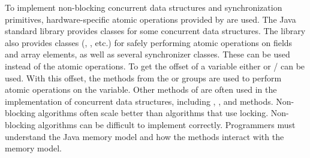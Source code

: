 %
{
  To implement
  non-blocking concurrent data structures and synchronization primitives, hardware-specific atomic operations
  provided by \smu{} are used.
}
{The Java standard library provides classes for some concurrent data structures.
The library also provides classes
(, , etc.)
for safely performing atomic operations on fields and array elements, as well
as several synchronizer classes. These
can be used instead of the \unsafe{} atomic operations.}
{To get the offset of a \java{} variable either  or
  / can be used.
With this offset, the methods from the  or  groups are used to perform atomic operations on the variable.
Other methods of \unsafe{} are often used in the implementation of concurrent
data structures, including , , and  methods.
}
{Non-blocking algorithms often scale better than algorithms that use locking.}
{Non-blocking algorithms can be difficult to implement correctly. Programmers
must understand the Java memory model and how the \unsafe{} methods interact
with the memory model.}

\newcommand\foundinfence{198}
\newcommand\usedbyfence{9795}
\newcommand\mostusedfence{\fencemost}
\newcommand\membersfence{Methods of the \smugroup{Fence} group, or methods of
the \smugroup{Get/Put Volatile} groups or \smugroup{Put Ordered} group}
\newcommand\namefence{Strongly Consistent Shared Variables}


